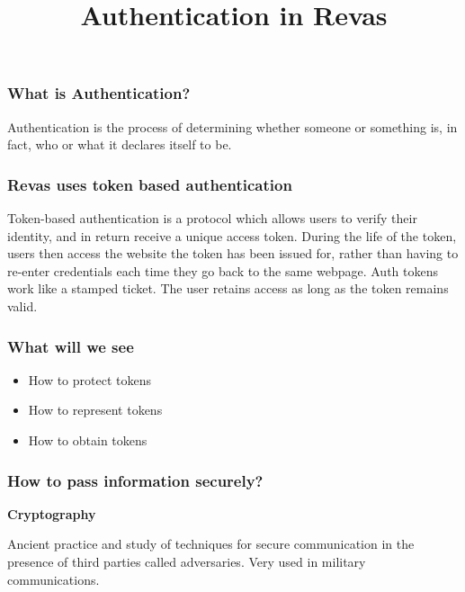 \documentclass{beamer}
\title{Authentication in Revas}
\begin{document}
\frame{\titlepage}

\begin{frame}
	\frametitle{What is Authentication?}
	
	Authentication is the process of determining whether someone or something is, in fact, who or what it declares itself to be.
\end{frame}

\begin{frame}
	\frametitle{Revas uses token based authentication}
	
	Token-based authentication is a protocol which allows users to verify their identity, and in return receive a unique access token.  \newline
	During the life of the token, users then access the website the token has been issued for, rather than having to re-enter credentials each time they go back to the same webpage.  \newline
	Auth tokens work like a stamped ticket. The user retains access as long as the token remains valid.
\end{frame}

\begin{frame}
	\frametitle{What will we see}
	
	\begin{itemize}
		\item How to protect tokens
		\item How to represent tokens
		\item How to obtain tokens
	\end{itemize}
\end{frame}

\begin{frame}
	\frametitle{How to pass information securely?}
	
	{\footnotesize \textbf{\textcolor{revassecondary}{Cryptography}}}
	
	Ancient practice and study of techniques for secure communication in the presence of third parties called adversaries.  \newline
	Very used in military communications.
	
\end{frame}
\end{document}
